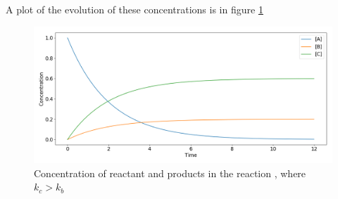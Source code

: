 \documentclass[a4paper,10pt]{article}
\begin{document}
\begin{enumerate}[label=\alph*)]
	A plot of the evolution of these concentrations is in figure \ref{plot}
	\begin{figure}[H]
\centering
\includegraphics[width=\textwidth]{question}
\caption{Concentration of reactant and products in the reaction , where $k_c > k_b$}\label{plot}
\end{figure}
\end{enumerate}
\end{document}
